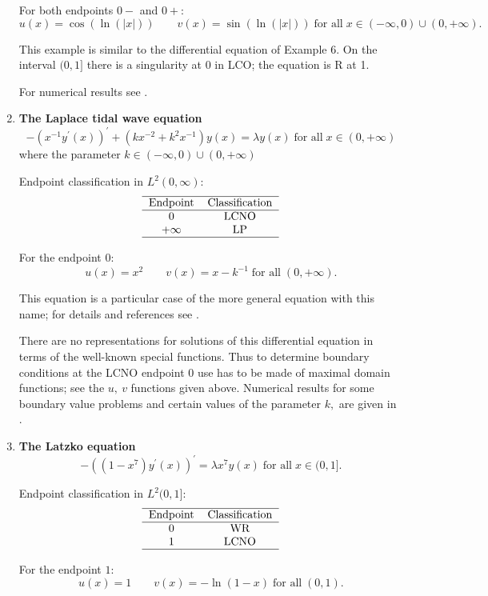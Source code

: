 \documentclass[12pt]{amsart}%
\theoremstyle{plain}
\numberwithin{equation}{section}
\begin{document}
\begin{enumerate}
For both endpoints $0-$ and $0+$:%
\[
u(x)=\cos\left(  \ln(\left|  x\right|  )\right)  \quad\quad v(x)=\sin\left(
\ln(\left|  x\right|  )\right)  \;\text{for all}\;x\in(-\infty,0)\cup
(0,+\infty).
\]

This example is similar to the differential equation of Example 6. On the
interval $(0,1]$ there is a singularity at $0$ in LCO; the equation is R at 1.

For numerical results see \cite[Example 5]{BEZ}.

\item \textbf{The Laplace tidal wave equation}%
\[
-(x^{-1}y^{\prime}(x))^{\prime}+\left(  kx^{-2}+k^{2}x^{-1}\right)
y(x)=\lambda y(x)\;\text{for all}\;x\in(0,+\infty)
\]
where the parameter $k\in(-\infty,0)\cup(0,+\infty)$

Endpoint classification in $L^{2}(0,\infty)$:%
\[%
\begin{tabular}
[c]{cc}\hline
Endpoint & Classification\\\hline
$0$ & LCNO\\
$+\infty$ & LP\\\hline
\end{tabular}
\]

For the endpoint $0$:%
\[
u(x)=x^{2}\quad\quad v(x)=x-k^{-1}\;\text{for all}\;(0,+\infty).
\]

This equation is a particular case of the more general equation with this
name; for details and references see \cite{H}.

There are no representations for solutions of this differential equation in
terms of the well-known special functions. Thus to determine boundary
conditions at the LCNO endpoint $0$ use has to be made of maximal domain
functions; see the $u,\ v$ functions given above. Numerical results for some
boundary value problems and certain values of the parameter $k,$ are given in
\cite[Example 8]{BEZ}.

\item \textbf{The Latzko equation}%
\[
-((1-x^{7})y^{\prime}(x))^{\prime}=\lambda x^{7}y(x)\;\text{for all}%
\;x\in(0,1].
\]

Endpoint classification in $L^{2}(0,1]$:%
\[%
\begin{tabular}
[c]{cc}\hline
Endpoint & Classification\\\hline
$0$ & WR\\
$1$ & LCNO\\\hline
\end{tabular}
\]

For the endpoint $1$:%
\[
u(x)=1\quad\quad v(x)=-\ln(1-x)\;\text{for all}\;(0,1).
\]


\end{enumerate}
\end{document}
